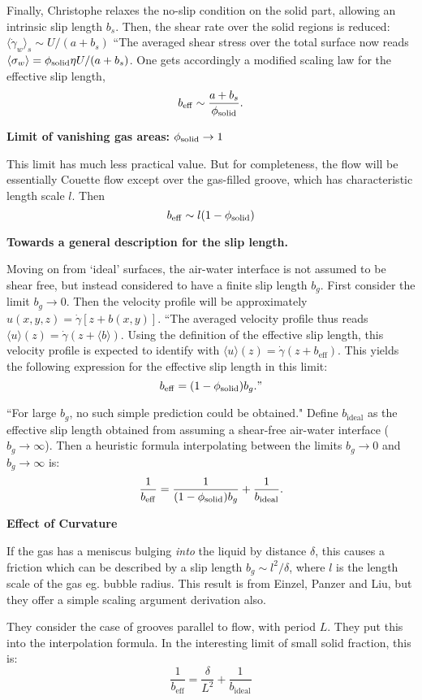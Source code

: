 \documentclass{article}
\newcommand{\beff}{\ensuremath{b_{\mathrm{eff}}}}
\begin{document}
Finally, Christophe relaxes the no-slip condition on the solid part, allowing an intrinsic slip length $b_s$. Then, the shear rate over the solid regions is reduced: 
$\langle \dot{\gamma}_w \rangle_s \sim U/(a + b_s) $ ``The averaged shear stress over the total surface now reads $ \langle \sigma_w \rangle = \phi_{\mathrm{solid}} \eta U/(a + b_s) $.  One gets accordingly a modified scaling law for the effective slip length,
\[ \beff \sim \frac{a+b_s}{\phisol}. \]

\textbf{Limit of vanishing gas areas: $\phi_{\mathrm{solid}} \rightarrow 1$}

This limit has much less practical value. But for completeness, the flow will be essentially Couette flow except over the gas-filled groove, which has characteristic length scale $l$. Then
\[ \beff \sim l(1-\phisol) \]

\textbf{Towards a general description for the slip length.}

Moving on from `ideal' surfaces, the air-water interface is not assumed to be shear free, but instead considered to have a finite slip length $b_g$. First consider the limit $b_g \rightarrow 0$. Then the velocity profile will be approximately $u(x,y,z) = \dot{\gamma} [z + b(x,y)]$.  ``The averaged velocity profile thus reads 
$ \langle u \rangle (z) = \dot{\gamma}(z + \langle b \rangle ) $. Using the definition of the effective slip length, this velocity profile is expected to identify with $\langle u \rangle (z) = \dot{\gamma}(z + \beff ) $. This yields the following expression for the effective slip length in this limit:
\[ \beff = (1 - \phisol) b_g." \]

``For large $b_g$, no such simple prediction could be obtained."  Define $b_{\mathrm{ideal}}$ as the effective slip length obtained from assuming a shear-free air-water interface ($b_g \rightarrow \infty$).  Then a heuristic formula interpolating between the limits $ b_g \rightarrow 0$ and $b_g \rightarrow \infty$ is:
\[ \frac{1}{\beff} = \frac{1}{(1-\phisol) b_g} + \frac{1}{b_{\mathrm{ideal}}}. \]

\textbf{Effect of Curvature}

If the gas has a meniscus bulging \emph{into} the liquid by distance $\delta$, this causes a friction which can be described by a slip length $b_g \sim l^2 / \delta$, where $l$ is the length scale of the gas eg. bubble radius.  This result is from Einzel, Panzer and Liu, but they offer a simple scaling argument derivation also.

They consider the case of grooves parallel to flow, with period $L$.
They put this into the interpolation formula.  In the interesting limit of small solid fraction, this is:
\[ \frac{1}{\beff} = \frac{\delta}{ L^2 } + \frac{1}{b_{\mathrm{ideal}}} \]
\end{document}
